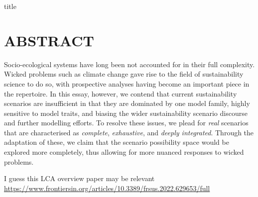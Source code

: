 \documentclass{article}
\begin{document}
{title}

\frontmatter
\tableofcontents

\mainmatter
\linenumbers

{\huge{\multiTitle}}

\section*{ABSTRACT}
Socio-ecological systems have long been not accounted for in their full complexity. Wicked problems such as climate change gave rise to the field of sustainability science to do so, with prospective analyses having become an important piece in the repertoire. In this essay, however, we contend that current sustainability scenarios are insufficient in that they are dominated by one model family, highly sensitive to model traits, and biasing the wider sustainability scenario discourse and further modelling efforts. To resolve these issues, we plead for \textit{real} scenarios that are characterised as \textit{complete}, \textit{exhaustive}, and \textit{deeply integrated}. Through the adaptation of these, we claim that the scenario possibility space would be explored more completely, thus allowing for more nuanced responses to wicked problems.

I guess this LCA overview paper may be relevant \url{https://www.frontiersin.org/articles/10.3389/frsus.2022.629653/full}
\end{document}
